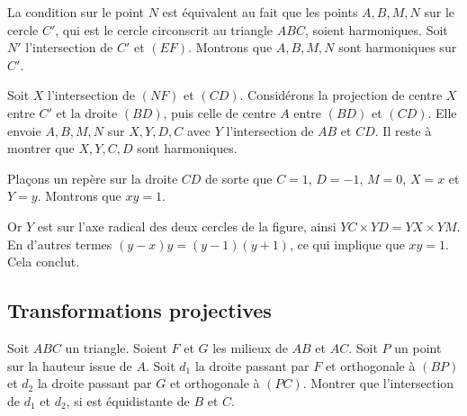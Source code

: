 \begin{sol}
\begin{center}

\end{center}

La condition sur le point $N$ est équivalent au fait que les points $A,B,M,N$ sur le cercle $C'$, qui est le cercle circonscrit au triangle $ABC$, soient harmoniques. Soit $N'$ l'intersection de $C'$ et $(EF)$. Montrons que $A,B,M,N$ sont harmoniques sur $C'$.

\medskip

Soit $X$ l'intersection de $(NF)$ et $(CD)$. Considérons la projection de centre $X$ entre $C'$ et la droite $(BD)$, puis celle de centre $A$ entre $(BD)$ et $(CD)$. Elle envoie $A,B,M,N$ sur $X,Y,D,C$ avec $Y$ l'intersection de $AB$ et $CD$. Il reste à montrer que $X,Y,C,D$ sont harmoniques.

\medskip

Plaçons un repère sur la droite $CD$ de sorte que $C=1$, $D=-1$, $M=0$, $X=x$ et $Y=y$. Montrons que $xy=1$. 

Or $Y$ est sur l'axe radical des deux cercles de la figure, ainsi $YC\times YD=YX\times YM$. En d'autres termes $(y-x)y=(y-1)(y+1)$, ce qui implique que $xy=1$. Cela conclut.

\end{sol}

\subsection*{Transformations projectives}

\begin{exo}
Soit $ABC$ un triangle. Soient $F$ et $G$ les milieux de $AB$ et $AC$. Soit $P$ un point sur la hauteur issue de $A$. Soit $d_1$ la droite passant par $F$ et orthogonale à $(BP)$ et $d_2$ la droite passant par $G$ et orthogonale à $(PC)$. Montrer que l'intersection de $d_1$ et $d_2$, si est équidistante de $B$ et $C$. 
\end{exo}

